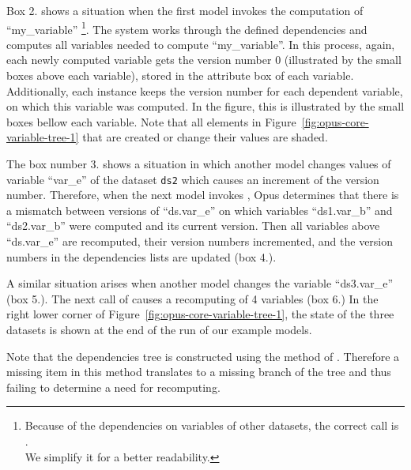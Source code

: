 {Box 2. shows a situation when the first model invokes the computation of
``my_variable'' \variablesindex \footnote{Because of the dependencies on variables of other
  datasets, the correct call is\\
  .\\
  We simplify it for
  a better readability.}. The system works through the defined dependencies and
computes all variables \variablesindex needed to compute ``my_variable''. \variablesindex In this process,
again, each newly computed variable \variablesindex gets the version number 0 (illustrated by
the small boxes above each variable), \variablesindex stored in the attribute \attributesindex box of each
variable. \variablesindex Additionally, each  \variablesindex instance keeps the version
number for each dependent variable, \variablesindex on which this variable \variablesindex was computed. In
the figure, this is illustrated by the small boxes bellow each variable. \variablesindex
Note that all elements in Figure~\ref{fig:opus-core-variable-tree-1} that are
created or change their values are shaded.

The box number 3. shows a situation in which another model changes values of
variable ``var_e'' of the dataset \datasetindex \verb|ds2| which causes an increment of the
version number. Therefore, when the next model invokes
, \variablesindex Opus determines that there is a
mismatch between versions of ``ds.var_e'' on which variables \variablesindex ``ds1.var_b'' and
``ds2.var_b'' were computed and its current version. Then all
variables \variablesindex above ``ds.var_e'' are recomputed, their version numbers
incremented, and the version numbers in the dependencies lists are updated
(box 4.).

A similar situation arises when another model changes the variable \variablesindex
``ds3.var_e'' (box 5.). The next call of
 \variablesindex causes a recomputing of 4
variables \variablesindex (box 6.) In the right lower corner of
Figure~\ref{fig:opus-core-variable-tree-1}, the state of the three datasets \datasetindex is
shown at the end of the run of our example models.

Note that the dependencies tree is constructed using the
 method of . \variablesindex Therefore a missing item
in this method translates to a missing branch of the tree and thus failing to
determine a need for recomputing.

}
